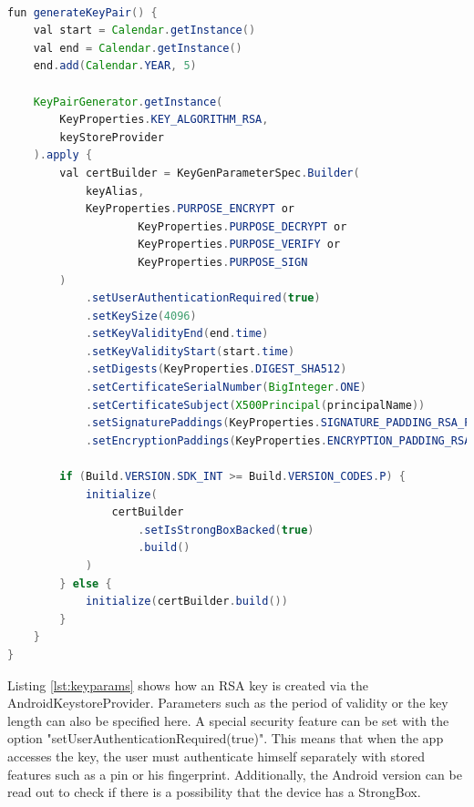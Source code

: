 \documentclass[12pt,oneside,a4paper,parskip]{scrbook}
\begin{document}
\begin{lstlisting}[label=lst:keyparams,
				   language=java,
				   firstnumber=1,
				   caption=Creating an RSA key pair]

fun generateKeyPair() {
    val start = Calendar.getInstance()
    val end = Calendar.getInstance()
    end.add(Calendar.YEAR, 5)
    
    KeyPairGenerator.getInstance(
        KeyProperties.KEY_ALGORITHM_RSA,
        keyStoreProvider
    ).apply {
        val certBuilder = KeyGenParameterSpec.Builder(
            keyAlias,
            KeyProperties.PURPOSE_ENCRYPT or
                    KeyProperties.PURPOSE_DECRYPT or
                    KeyProperties.PURPOSE_VERIFY or
                    KeyProperties.PURPOSE_SIGN
        )
            .setUserAuthenticationRequired(true)
            .setKeySize(4096)
            .setKeyValidityEnd(end.time)
            .setKeyValidityStart(start.time)
            .setDigests(KeyProperties.DIGEST_SHA512)
            .setCertificateSerialNumber(BigInteger.ONE)
            .setCertificateSubject(X500Principal(principalName))
            .setSignaturePaddings(KeyProperties.SIGNATURE_PADDING_RSA_PKCS1)
            .setEncryptionPaddings(KeyProperties.ENCRYPTION_PADDING_RSA_PKCS1)

        if (Build.VERSION.SDK_INT >= Build.VERSION_CODES.P) {
            initialize(
                certBuilder
                    .setIsStrongBoxBacked(true)
                    .build()
            )
        } else {
            initialize(certBuilder.build())
        }
    }
}

\end{lstlisting}

Listing \ref{lst:keyparams} shows how an RSA key is created via the AndroidKeystoreProvider. Parameters such as the period of validity or the key length can also be specified here. A special security feature can be set with the option "setUserAuthenticationRequired(true)". This means that when the app accesses the key, the user must authenticate himself separately with stored features such as a pin or his fingerprint. Additionally, the Android version can be read out to check if there is a possibility that the device has a StrongBox.
\newpage
\end{document}
